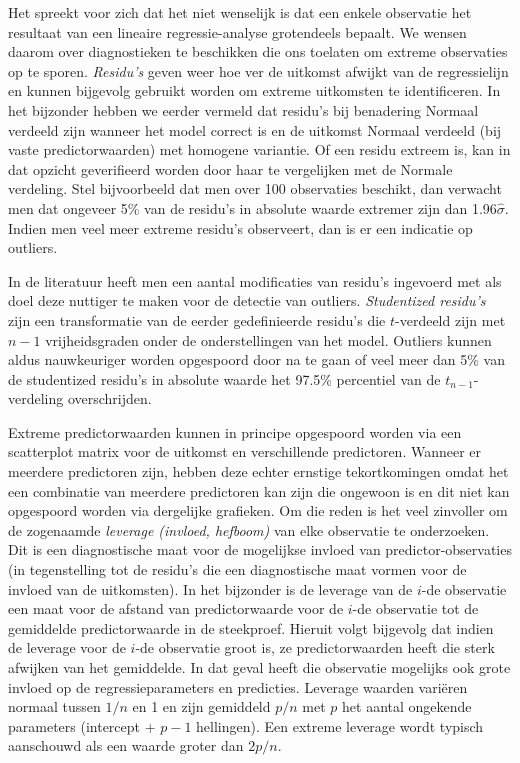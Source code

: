 \documentclass[
  12pt,dutch]{book}
\theoremstyle{definition}
\theoremstyle{definition}
\theoremstyle{definition}
\theoremstyle{definition}
\theoremstyle{remark}
\begin{document}
Het spreekt voor zich dat het niet wenselijk is dat een enkele observatie het resultaat van een lineaire regressie-analyse grotendeels bepaalt. We wensen daarom over diagnostieken te beschikken die ons toelaten om extreme observaties op te sporen. \emph{Residu's} geven weer hoe ver de uitkomst afwijkt van de regressielijn en kunnen bijgevolg gebruikt worden om extreme uitkomsten te identificeren. In het bijzonder hebben we eerder vermeld dat residu's bij benadering Normaal verdeeld zijn wanneer het model correct is en de uitkomst Normaal verdeeld (bij vaste predictorwaarden) met homogene variantie. Of een residu extreem is, kan in dat opzicht geverifieerd worden door haar te vergelijken met de Normale verdeling. Stel bijvoorbeeld dat men over 100 observaties beschikt, dan verwacht men dat ongeveer 5\% van de residu's in absolute waarde extremer zijn dan 1.96\(\hat{\sigma}\). Indien men veel meer extreme residu's observeert, dan is er een indicatie op outliers.

In de literatuur heeft men een aantal modificaties van residu's ingevoerd met als doel deze nuttiger te maken voor de detectie van outliers. \emph{Studentized residu's} zijn een transformatie van de eerder gedefinieerde residu's die \(t\)-verdeeld zijn met \(n-1\) vrijheidsgraden onder de onderstellingen van het model. Outliers kunnen aldus nauwkeuriger worden opgespoord door na te gaan of veel meer dan 5\% van de studentized residu's in absolute waarde het 97.5\% percentiel van de \(t_{n-1}\)-verdeling overschrijden.

Extreme predictorwaarden kunnen in principe opgespoord worden via een scatterplot matrix voor de uitkomst en verschillende predictoren. Wanneer er meerdere predictoren zijn, hebben deze echter ernstige tekortkomingen omdat het een combinatie van meerdere predictoren kan zijn die ongewoon is en dit niet kan opgespoord worden via dergelijke grafieken. Om die reden is het veel zinvoller om de zogenaamde \emph{leverage (invloed, hefboom)} van elke observatie te onderzoeken. Dit is een diagnostische maat voor de mogelijkse invloed van predictor-observaties (in tegenstelling tot de residu's die een diagnostische maat vormen voor de invloed van de uitkomsten). In het bijzonder is de leverage van de \(i\)-de observatie een maat voor de afstand van predictorwaarde voor de \(i\)-de observatie tot de gemiddelde predictorwaarde in de steekproef. Hieruit volgt bijgevolg dat indien de leverage voor de \(i\)-de observatie groot is, ze predictorwaarden heeft die sterk afwijken van het gemiddelde. In dat geval heeft die observatie mogelijks ook grote invloed op de regressieparameters en predicties. Leverage waarden variëren normaal tussen \(1/n\) en 1 en zijn gemiddeld \(p/n\) met \(p\) het aantal ongekende parameters (intercept + \(p-1\) hellingen). Een extreme leverage wordt typisch aanschouwd als een waarde groter dan \(2p/n\).
\end{document}
